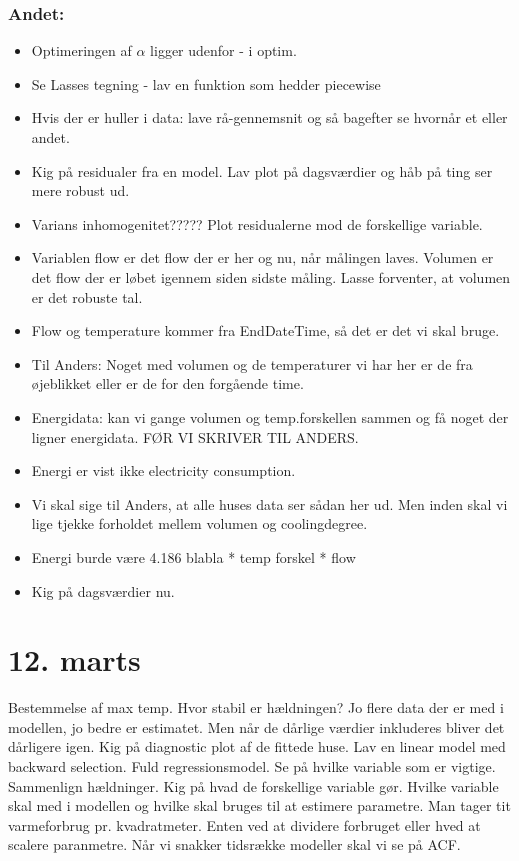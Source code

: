 \subsubsection{Andet:}
\begin{itemize}
    \item Optimeringen af $\alpha$ ligger udenfor - i optim.
    \item Se Lasses tegning - lav en funktion som hedder piecewise
    \item Hvis der er huller i data: lave rå-gennemsnit og så bagefter se hvornår et eller andet.
    \item Kig på residualer fra en model. Lav plot på dagsværdier og håb på ting ser mere robust ud. 
    \item Varians inhomogenitet????? Plot residualerne mod de forskellige variable. 
    \item Variablen flow er det flow der er her og nu, når målingen laves. Volumen er det flow der er løbet igennem siden sidste måling. Lasse forventer, at volumen er det robuste tal. 
    \item Flow og temperature kommer fra EndDateTime, så det er det vi skal bruge. 
    \item Til Anders: Noget med volumen og de temperaturer vi har her er de fra øjeblikket eller er de for den forgående time. 
    \item Energidata: kan vi gange volumen og temp.forskellen sammen og få noget der ligner energidata. FØR VI SKRIVER TIL ANDERS. 
    \item Energi er vist ikke electricity consumption. 
    \item Vi skal sige til Anders, at alle huses data ser sådan her ud. Men inden skal vi lige tjekke forholdet mellem volumen og coolingdegree. 
    \item Energi burde være 4.186 blabla * temp forskel * flow
    \item Kig på dagsværdier nu. 
\end{itemize}

\pagebreak

\section{12. marts}
Bestemmelse af max temp. Hvor stabil er hældningen? Jo flere data der er med i modellen, jo bedre er estimatet. Men når de dårlige
værdier inkluderes bliver det dårligere igen.
Kig på diagnostic plot af de fittede huse. 
Lav en linear model med backward selection. Fuld regressionsmodel. Se på hvilke variable som er vigtige. Sammenlign hældninger.
Kig på hvad de forskellige variable gør. Hvilke variable skal med i modellen og hvilke skal bruges til at estimere parametre.
Man tager tit varmeforbrug pr. kvadratmeter. Enten ved at dividere forbruget eller hved at scalere paranmetre.
Når vi snakker tidsrække modeller skal vi se på ACF.

